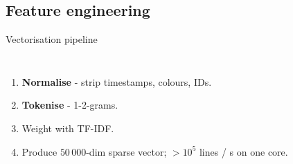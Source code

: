 \documentclass[15pt,aspectratio=169]{beamer}
\newcommand{\tfidf}{TF-IDF\xspace}
\begin{document}
\subsection{Feature engineering}
\begin{frame}{Vectorisation pipeline }
\begin{columns}
    \begin{enumerate}[<+->]
      \item \textbf{Normalise} - strip timestamps, colours, IDs.
      \item \textbf{Tokenise} - 1-2-grams.
      \item Weight with \tfidf.
      \item Produce \(50\,000\)-dim sparse vector; \(>10^{5}\) lines / s on one core.
    \end{enumerate}
    \centering
\end{columns}
\end{frame}

\end{document}
